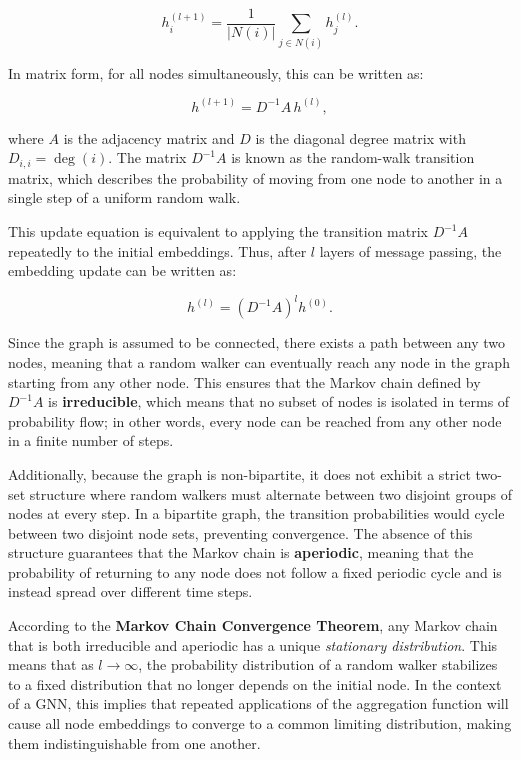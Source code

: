 \documentclass[a4paper,12pt]{article}
\begin{document}
\[
h_{i}^{(l+1)} = \frac{1}{|N(i)|} \sum_{j \in N(i)} h_{j}^{(l)}.
\]

In matrix form, for all nodes simultaneously, this can be written as:

\[
h^{(l+1)} = D^{-1} A\,h^{(l)},
\]

where \( A \) is the adjacency matrix and \( D \) is the diagonal degree matrix 
with \( D_{i,i} = \deg(i) \). The matrix \( D^{-1} A \) is known as the 
random-walk transition matrix, which describes the probability of moving from 
one node to another in a single step of a uniform random walk.

This update equation is equivalent to applying the transition matrix \( D^{-1} A \) 
repeatedly to the initial embeddings. Thus, after \( l \) layers of message passing, 
the embedding update can be written as:

\[
h^{(l)} = (D^{-1} A)^l h^{(0)}.
\]

Since the graph is assumed to be connected, there exists a path between any two nodes, meaning that a random walker can eventually reach any node in the graph starting from any other node. This ensures that the Markov chain defined by \( D^{-1} A \) is \textbf{irreducible}, which means that no subset of nodes is isolated in terms of probability flow; in other words, every node can be reached from any other node in a finite number of steps.

Additionally, because the graph is non-bipartite, it does not exhibit a strict two-set structure where random walkers must alternate between two disjoint groups of nodes at every step. In a bipartite graph, the transition probabilities would cycle between two disjoint node sets, preventing convergence. The absence of this structure guarantees that the Markov chain is \textbf{aperiodic}, meaning that the probability of returning to any node does not follow a fixed periodic cycle and is instead spread over different time steps.

According to the \textbf{Markov Chain Convergence Theorem}, any Markov chain that is both irreducible and aperiodic has a unique \textit{stationary distribution}. This means that as \( l \to \infty \), the probability distribution of a random walker stabilizes to a fixed distribution that no longer depends on the initial node. In the context of a GNN, this implies that repeated applications of the aggregation function will cause all node embeddings to converge to a common limiting distribution, making them indistinguishable from one another.
\end{document}
